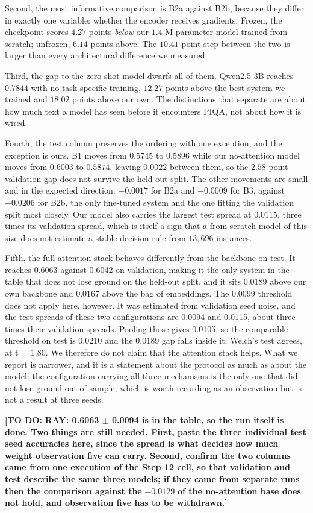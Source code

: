 \documentclass[11pt]{article}
\begin{document}
Second, the most informative comparison is B2a against B2b, because they differ in exactly one variable: whether the encoder receives gradients. Frozen, the checkpoint scores $4.27$ points \textit{below} our $1.4$ M-parameter model trained from scratch; unfrozen, $6.14$ points above. The $10.41$ point step between the two is larger than every architectural difference we measured.

Third, the gap to the zero-shot model dwarfs all of them. Qwen2.5-3B reaches $0.7844$ with no task-specific training, $12.27$ points above the best system we trained and $18.02$ points above our own. The distinctions that separate are about how much text a model has seen before it encounters PIQA, not about how it is wired.

Fourth, the test column preserves the ordering with one exception, and the exception is ours. B1 moves from $0.5745$ to $0.5896$ while our no-attention model moves from $0.6003$ to $0.5874$, leaving $0.0022$ between them, so the $2.58$ point validation gap does not survive the held-out split. The other movements are small and in the expected direction: $-0.0017$ for B2a and $-0.0009$ for B3, against $-0.0206$ for B2b, the only fine-tuned system and the one fitting the validation split most closely. Our model also carries the largest test spread at $0.0115$, three times its validation spread, which is itself a sign that a from-scratch model of this size does not estimate a stable decision rule from $13,696$ instances.

Fifth, the full attention stack behaves differently from the backbone on test. It reaches 0.6063 against 0.6042 on validation, making it the only system in the table that does not lose ground on the held-out split, and it sits 0.0189 above our own backbone and 0.0167 above the bag of embeddings. The 0.0099 threshold does not apply here, however. It was estimated from validation seed noise, and the test spreads of these two configurations are 0.0094 and 0.0115, about three times their validation spreads. Pooling those gives 0.0105, so the comparable threshold on test is 0.0210 and the 0.0189 gap falls inside it; Welch's test agrees, at t = 1.80. We therefore do not claim that the attention stack helps. What we report is narrower, and it is a statement about the protocol as much as about the model: the configuration carrying all three mechanisms is the only one that did not lose ground out of sample, which is worth recording as an observation but is not a result at three seeds.

\textbf{[TO DO: }\textbf{RAY: 0.6063 $\pm$ 0.0094 is in the table, so the run itself is done. Two things are still needed. First, paste the three individual test seed accuracies here, since the spread is what decides how much weight observation five can carry. Second, confirm the two columns came from one execution of the Step 12 cell, so that validation and test describe the same three models; if they came from separate runs then the comparison against the}\textbf{ } $-0.0129$ \textbf{ of the no-attention base does not hold, and observation five has to be withdrawn.]}
\end{document}
